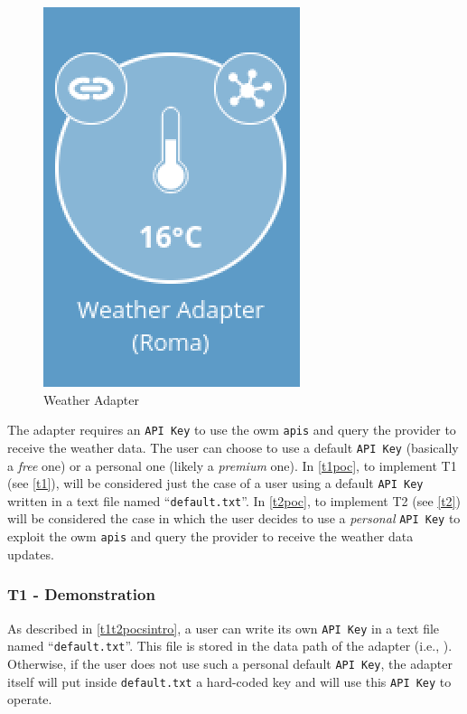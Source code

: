 \begin{figure}[H]
    \centering
    \includegraphics[scale=0.75]{images/addons/weather-adapter.png}
    \caption{Weather Adapter}
    \label{fig:t1adapter}
\end{figure}

The adapter requires an \texttt{API Key} to use the \gls{owm} \texttt{\glspl{api}} and query the provider to receive the weather data. The user can choose to use a default \texttt{API Key} (basically a \textit{free} one) or a personal one (likely a \textit{premium} one).
In \autoref{t1poc}, to implement T1 (see \autoref{t1}), will be considered just the case of a user using a default \texttt{API Key} written in a text file named ``\texttt{default.txt}''. In \autoref{t2poc}, to implement T2 (see \autoref{t2}) will be considered the case in which the user decides to use a \textit{personal} \texttt{API Key} to exploit the \gls{owm} \texttt{\glspl{api}} and query the provider to receive the weather data updates.


\subsubsection{T1 - Demonstration}
\label{t1poc}

As described in \autoref{t1t2pocsintro}, a user can write its own \texttt{API Key} in a text file named ``\texttt{default.txt}''. This file is stored in the data path of the adapter (i.e., ). Otherwise, if the user does not use such a personal default \texttt{API Key}, the adapter itself will put inside \texttt{default.txt} a hard-coded key and will use this \texttt{API Key} to operate.

